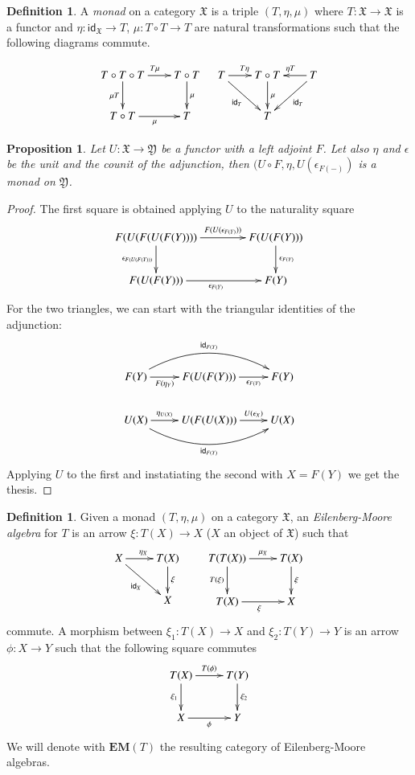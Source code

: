 \documentclass[12pt]{article}
\newtheorem{proposition}[lemma]{Proposition}
\theoremstyle{definition}
\newtheorem{definition}[lemma]{Definition}
\def\X{\mathfrak X}
\def\Y{\mathfrak Y}
\newcommand{\eim}[1]{\mathbf{EM}{(#1)}}
\numberwithin{equation}{section}
\newcommand{\id}[1]{\mathsf{id}_{#1}}
\begin{document}
\begin{definition}A \emph{monad} on a category $\X$ is a triple $(T, \eta, \mu)$ where $T:\X\rightarrow \X$ is a functor and $\eta:\id{\X}\rightarrow T$, $\mu:T\circ T\rightarrow T$ are natural transformations such that the following diagrams commute. 

	\[
	\xymatrix@C=20pt{
		T\circ T \circ T\ar[d]_{\mu T}\ar[r]^{T\mu}&T\circ T\ar[d]^\mu 
		\\
		T\circ T\ar[r]_\mu&T
	}	\quad 
\xymatrix@C=20pt{
	T\ar[r]^{T\eta}\ar[dr]_{\id{T}}&T\circ T\ar[d]^\mu  &T \ar[l]_{\eta T}\ar[dl]^{\id{T}}
	\\
	 &T
}
	\]
\end{definition}
\begin{proposition}Let $U:\X\rightarrow \Y$ be a functor with a left adjoint $F$. Let also $\eta$ and $\epsilon$ be the unit and the counit of the adjunction, then $(U\circ F, \eta, U(\epsilon_{F(-)} )$ is a monad on $\Y$.
	
\end{proposition}
\begin{proof}
	The first square is obtained applying $U$ to the naturality square
	\[
	\xymatrix@C=40pt{F(U(F(U(F(Y))))\ar[r]^-{F(U(\epsilon_{F(Y)}))}\ar[d]_-{\epsilon_{F(U(F(Y)))}} & F(U(F(Y)))\ar[d]^{\epsilon_{F(Y)}}\\
	F(U(F(Y)))\ar[r]_{\epsilon_{F(Y)}}& F(Y)}
	\]
For the two triangles, we can start with the triangular identities of the adjunction:
\[\xymatrix{F(Y)\ar@/^0.75cm/[rr]^{\id{F(Y)}}\ar[r]_-{F(\eta_Y)} & F(U(F(Y))) \ar[r]_-{\epsilon_{F(Y)}} & F(Y)\\
U(X) \ar@/_0.75cm/[rr]_{\id{F(Y)}}\ar[r]^-{\eta_{U(X)}}& U(F(U(X)))\ar[r]^-{U(\epsilon_X)}& U(X)}\]
Applying $U$ to the first and instatiating the second with $X=F(Y)$ we get the thesis.	
\end{proof}

\begin{definition} Given a monad $(T, \eta, \mu)$ on a category $\X$, an \emph{Eilenberg-Moore algebra} for $T$ is an arrow $\xi:T(X)\rightarrow X$ ($X$ an object of $\X$) such that 
	\[\xymatrix{X\ar[r]^{\eta_X} \ar[dr]_{\id{X}} & T(X)\ar[d]^{\xi}\\ & X} \qquad \xymatrix{ T(T(X))\ar[r]^-{\mu_X} \ar[d]_{T(\xi)} & T(X)\ar[d]^{\xi}\\ T(X)\ar[r]_{\xi} & X}
	\]
commute. A morphism between	$\xi_1:T(X)\rightarrow X$ and $\xi_2:T(Y)\rightarrow Y$ is an arrow $\phi: X\rightarrow Y$ such that the following square commutes
\[\xymatrix{T(X)\ar[r]^{T(\phi)} \ar[d]_{\xi_1}& T(Y)\ar[d]^{\xi_2}\\X\ar[r]_{\phi}& Y}\]
We will denote with $\eim{T}$ the resulting category of Eilenberg-Moore algebras.
\end{definition}
\end{document}
